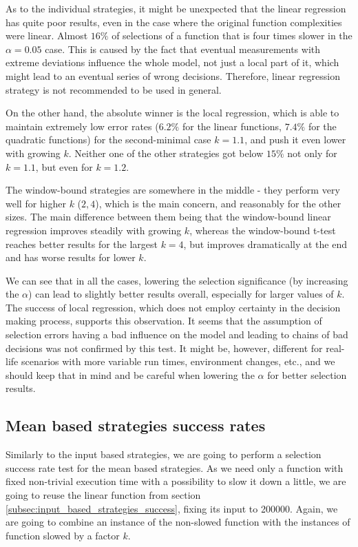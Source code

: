As to the individual strategies, it might be unexpected that the linear regression has quite poor results, even in the case where the original function complexities were linear. Almost $16\%$ of selections of a function that is four times slower in the $\alpha = 0.05$ case. This is caused by the fact that eventual measurements with extreme deviations influence the whole model, not just a local part of it, which might lead to an eventual series of wrong decisions. Therefore, linear regression strategy is not recommended to be used in general.

On the other hand, the absolute winner is the local regression, which is able to maintain extremely low error rates ($6.2\%$ for the linear functions, $7.4\%$ for the quadratic functions) for the second-minimal case $k=1.1$, and push it even lower with growing $k$. Neither one of the other strategies got below $15\%$ not only for $k=1.1$, but even for $k=1.2$.

The window-bound strategies are somewhere in the middle - they perform very well for higher $k$ ($2, 4$), which is the main concern, and reasonably for the other sizes. The main difference between them being that the window-bound linear regression improves steadily with growing $k$, whereas the window-bound t-test reaches better results for the largest $k=4$, but improves dramatically at the end and has worse results for lower $k$.

We can see that in all the cases, lowering the selection significance (by increasing the $\alpha$) can lead to slightly better results overall, especially for larger values of $k$. The success of local regression, which does not employ certainty in the decision making process, supports this observation. It seems that the assumption of selection errors having a bad influence on the model and leading to chains of bad decisions was not confirmed by this test. It might be, however, different for real-life scenarios with more variable run times, environment changes, etc., and we should keep that in mind and be careful when lowering the $\alpha$ for better selection results.

\subsection{Mean based strategies success rates}

Similarly to the input based strategies, we are going to perform a selection success rate test for the mean based strategies. As we need only a function with fixed non-trivial execution time with a possibility to slow it down a little, we are going to reuse the linear function from section \ref{subsec:input_based_strategies_success}, fixing its input to 200000. Again, we are going to combine an instance of the non-slowed function with the instances of function slowed by a factor $k$. 

